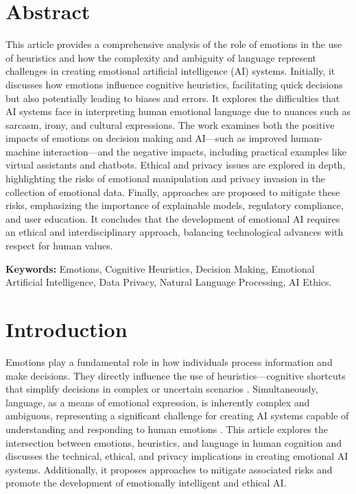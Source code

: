 \documentclass[a4paper,12pt]{report}
\begin{document}
	
	\newpage
	\thispagestyle{empty}
	\mbox{}
	\newpage
	
	
	\section*{Abstract}
	
	This article provides a comprehensive analysis of the role of emotions in the use of heuristics and how the complexity and ambiguity of language represent challenges in creating emotional artificial intelligence (AI) systems. Initially, it discusses how emotions influence cognitive heuristics, facilitating quick decisions but also potentially leading to biases and errors. It explores the difficulties that AI systems face in interpreting human emotional language due to nuances such as sarcasm, irony, and cultural expressions. The work examines both the positive impacts of emotions on decision making and AI—such as improved human-machine interaction—and the negative impacts, including practical examples like virtual assistants and chatbots. Ethical and privacy issues are explored in depth, highlighting the risks of emotional manipulation and privacy invasion in the collection of emotional data. Finally, approaches are proposed to mitigate these risks, emphasizing the importance of explainable models, regulatory compliance, and user education. It concludes that the development of emotional AI requires an ethical and interdisciplinary approach, balancing technological advances with respect for human values.
	
	\vspace{4em}
	
	\noindent\textbf{Keywords:} \normalsize{Emotions, Cognitive Heuristics, Decision Making, Emotional Artificial Intelligence, Data Privacy, Natural Language Processing, AI Ethics.}
	
	\newpage
	
	
	\section{Introduction}
	
	Emotions play a fundamental role in how individuals process information and make decisions. They directly influence the use of heuristics—cognitive shortcuts that simplify decisions in complex or uncertain scenarios \parencite{kahneman1974}. Simultaneously, language, as a means of emotional expression, is inherently complex and ambiguous, representing a significant challenge for creating AI systems capable of understanding and responding to human emotions \parencite{chomsky1965}. This article explores the intersection between emotions, heuristics, and language in human cognition and discusses the technical, ethical, and privacy implications in creating emotional AI systems. Additionally, it proposes approaches to mitigate associated risks and promote the development of emotionally intelligent and ethical AI.
	
\end{document}
